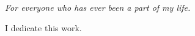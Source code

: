 \begin{dedication}
\itshape             %
\raggedleft          %
For everyone who has ever been a part of my life.
\par   %
\vspace{2\baselineskip}
I dedicate this work.
\vspace{\baselineskip}
\par %
\end{dedication}
